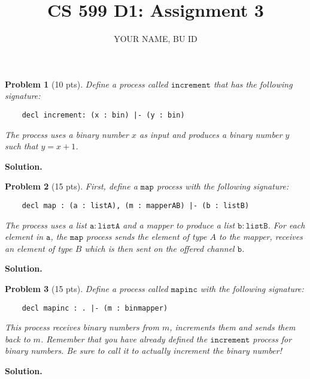 \documentclass{article}
\title{CS 599 D1: Assignment 3}
\author{YOUR NAME, BU ID}
\date{}
\newcommand{\mt}[1]{\mathtt{#1}}
\newtheorem{problem}{Problem}
\newenvironment{solution}{\textbf{Solution.}}{}
\begin{document}
\maketitle


\begin{problem}[10 pts]
  Define a process called $\mt{increment}$ that has the following signature:
  \begin{lstlisting}
    decl increment: (x : bin) |- (y : bin)
  \end{lstlisting}
  The process uses a binary number $x$ as input and produces a binary number $y$ such that $y = x + 1$.
\end{problem}

\begin{solution}

\end{solution}

\begin{problem}[15 pts]
  First, define a $\mt{map}$ process with the following signature:
  \begin{lstlisting}
    decl map : (a : listA), (m : mapperAB) |- (b : listB)
  \end{lstlisting}
  The process uses a list $\mt{a : listA}$ and a mapper to produce a list $\mt{b : listB}$. For each element in $\mt{a}$,
  the $\mt{map}$ process sends the element of type $A$ to the mapper, receives an element of type $B$ which is then sent
  on the offered channel $\mt{b}$.
\end{problem}

\begin{solution}
  
\end{solution}

\begin{problem}[15 pts]
  Define a process called $\mt{mapinc}$ with the following signature:
  \begin{lstlisting}
    decl mapinc : . |- (m : binmapper)
  \end{lstlisting}
  This process receives binary numbers from $m$, increments them and sends them back to $m$.
  Remember that you have already defined the $\mt{increment}$ process for binary numbers.
  Be sure to call it to actually increment the binary number!
\end{problem}

\begin{solution}
  
\end{solution}
\end{document}
